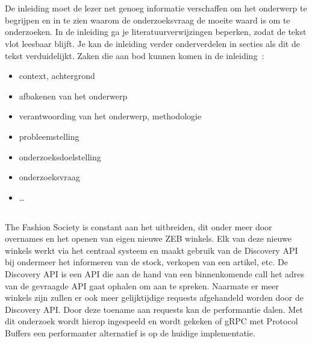 
\chapter{}
\label{ch:inleiding}

De inleiding moet de lezer net genoeg informatie verschaffen om het onderwerp te begrijpen en in te zien waarom de onderzoeksvraag de moeite waard is om te onderzoeken. In de inleiding ga je literatuurverwijzingen beperken, zodat de tekst vlot leesbaar blijft. Je kan de inleiding verder onderverdelen in secties als dit de tekst verduidelijkt. Zaken die aan bod kunnen komen in de inleiding~\autocite{Pollefliet2011}:

\begin{itemize}
  \item context, achtergrond
  \item afbakenen van het onderwerp
  \item verantwoording van het onderwerp, methodologie
  \item probleemstelling
  \item onderzoeksdoelstelling
  \item onderzoeksvraag
  \item \ldots
\end{itemize}

\section{}
\label{sec:probleemstelling}

The Fashion Society is constant aan het uitbreiden, dit onder meer door overnames en het openen van eigen nieuwe ZEB winkels. Elk van deze nieuwe winkels werkt via het centraal systeem en maakt gebruik van de Discovery API bij ondermeer het informeren van de stock, verkopen van een artikel, etc. De Discovery API is een API die aan de hand van een binnenkomende call het adres van de gevraagde API gaat ophalen om aan te spreken. Naarmate er meer winkels zijn zullen er ook meer gelijktijdige requests afgehandeld worden door de Discovery API. Door deze toename aan requests kan de performantie dalen. Met dit onderzoek wordt hierop ingespeeld en wordt gekeken of gRPC met Protocol Buffers een performanter alternatief is op de huidige implementatie.

